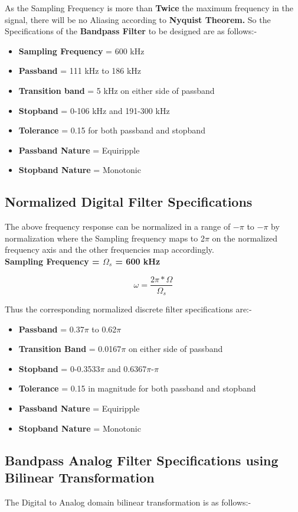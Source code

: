 \documentclass[12pt]{article}
\begin{document}
As the Sampling Frequency is more than \textbf{Twice} the maximum frequency in the signal, there will be no Aliasing according to \textbf{Nyquist Theorem.}
\noindent So the Specifications of the \textbf{Bandpass Filter} to be designed are as follows:-

\begin{itemize}
    \item \textbf{Sampling Frequency} = 600 kHz
    \item \textbf{Passband} = 111 kHz to 186 kHz
    \item \textbf{Transition band} = 5 kHz on either side of passband
    \item \textbf{Stopband} = 0-106 kHz and 191-300 kHz
    \item \textbf{Tolerance} = 0.15 for both passband and stopband
    \item \textbf{Passband Nature} = Equiripple
    \item \textbf{Stopband Nature} = Monotonic
\end{itemize}
\newpage

\subsection{Normalized Digital Filter Specifications}
The above frequency response can be normalized in a range of $-\pi$ to $-\pi$ by normalization where the Sampling frequency maps to 2$\pi$ on the normalized frequency axis and the other frequencies map accordingly.\\
\textbf{Sampling Frequency = $\Omega_{s}$ = 600 kHz}

\[\omega = \frac{2\pi*\Omega}{\Omega_{s}}\]

Thus the corresponding normalized discrete filter specifications are:-
\begin{itemize}
    \item \textbf{Passband} = 0.37$\pi$ to 0.62$\pi$
    \item \textbf{Transition Band} = 0.0167$\pi$ on either side of passband
    \item \textbf{Stopband} = 0-0.3533$\pi$ and 0.6367$\pi$-$\pi$
    \item\textbf{Tolerance} = 0.15 in magnitude for both passband and stopband
    \item \textbf{Passband Nature} = Equiripple
    \item \textbf{Stopband Nature} = Monotonic
\end{itemize}

\subsection{Bandpass Analog Filter Specifications using Bilinear Transformation}
The Digital to Analog domain bilinear transformation is as follows:-
\end{document}
